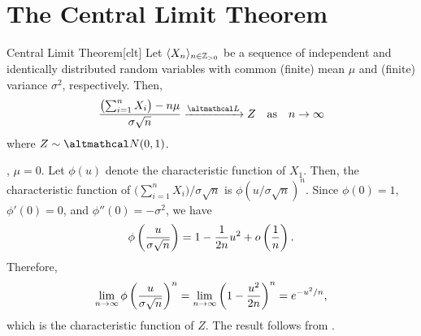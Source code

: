 \documentclass[../probability.tex]{subfiles}
\begin{document}
\section{The Central Limit Theorem}

\begin{Theorem}{Central Limit Theorem}[clt]
    Let \(\lang X_n \rang_{n \in \ZZ_{>0}}\) be a sequence of
    independent and identically distributed random variables
    with common (finite) mean \(\mu\) and (finite) variance \(\sigma^2\), respectively.
    Then,
    \[
        \frac{\bigl(\sum_{i=1}^n X_i\bigr) - n\mu}{\sigma\sqrt{n}} \lawconv Z
        \quad\text{as}\quad n \to \infty
    \]
    where \(Z \sim \mcal{N}(0, 1)\).
\end{Theorem}
\begin{myproof}
    \WLOG, \(\mu = 0\).
    Let \(\phi(u)\) denote the characteristic function of \(X_1\).
    Then, the characteristic function of \(\bigl(\sum_{i=1}^n X_i\bigr)/\sigma\sqrt{n}\) is
    \(\phi(u/\sigma\sqrt{n})^n\). Since \(\phi(0) = 1\), \(\phi'(0) = 0\),
    and \(\phi''(0) = -\sigma^2\), we have
    \[
         \phi\left(\frac{u}{\sigma\sqrt{n}}\right) = 1 - \frac{1}{2n}u^2 + o \left(\frac{1}{n}\right)\text.
    \]
    Therefore,
    \[
        \lim_{n \to \infty} \phi \left( \frac{u}{\sigma\sqrt{n}} \right)^n
        = \lim_{n \to \infty} \left( 1-\frac{u^2}{2n} \right)^n = e^{-u^2/n}\text,
    \]
    which is the characteristic function of \(Z\).
    The result follows from .
\end{myproof}
\end{document}
